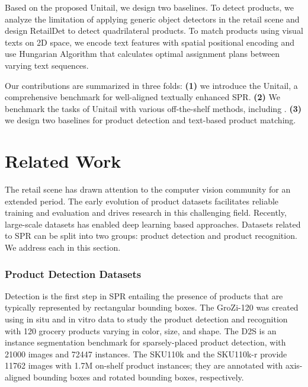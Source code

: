 \documentclass[runningheads]{llncs}
\begin{document}
Based on the proposed Unitail, we design two baselines. To detect products, we analyze the limitation of applying generic object detectors in the retail scene and design RetailDet to detect quadrilateral products. To match products using visual texts on 2D space, we encode text features with spatial positional encoding and use Hungarian Algorithm \cite{hungarian_algorithm} that calculates optimal assignment plans between varying text sequences. 

Our contributions are summarized in three folds: \textbf{(1)} we introduce the Unitail, a comprehensive benchmark for well-aligned textually enhanced SPR. \textbf{(2)} We benchmark the tasks of Unitail with various off-the-shelf methods, including \cite{FCENet2021,PANet2019,PSENet2019,DBNet2020,RIDet,xu2019gliding,RSDet,he2017mask,CRNN,sheng2019nrtr,yue2020robustscanner,li2019SAR,SATRN,fang2021ABINet,densebox,ResNet,efficientnetv2,pan2018IBNNet}. \textbf{(3)} we design two baselines for product detection and text-based product matching. 

\section{Related Work}
The retail scene has drawn attention to the computer vision community for an extended period. The early evolution of product datasets \cite{Grozi-120,SOIL-47,Supermarket2010} facilitates reliable training and evaluation and drives research in this challenging field. Recently, large-scale datasets \cite{AliProduct,SKU110k} has enabled deep learning based approaches. Datasets related to SPR can be split into two groups: product detection and product recognition. We address each in this section. 

\subsubsection{Product Detection Datasets}
Detection is the first step in SPR entailing the presence of products that are typically represented by rectangular bounding boxes. The GroZi-120 \cite{Grozi-120} was created using in situ and in vitro data to study the product detection and recognition with 120 grocery products varying in color, size, and shape. The D2S \cite{D2S2018} is an instance segmentation benchmark for sparsely-placed product detection, with 21000 images and 72447 instances. The SKU110k\cite{SKU110k} and the SKU110k-r\cite{SKU110k-r} provide 11762 images with 1.7M on-shelf product instances; they are annotated with axis-aligned bounding boxes and rotated bounding boxes, respectively. 
\end{document}
